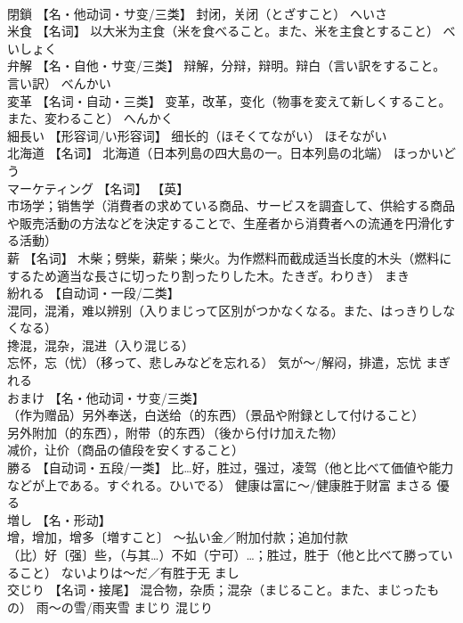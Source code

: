 \documentclass[8pt]{extreport}
\begin{document}
\begin{CJK}{UTF8}{min}
\\	閉鎖	【名・他动词・サ变/三类】 封闭，关闭（とざすこと）	へいさ	
\\	米食	【名词】 以大米为主食（米を食べること。また、米を主食とすること）	べいしょく	
\\	弁解	【名・自他・サ变/三类】 辩解，分辩，辩明。辩白（言い訳をすること。言い訳）	べんかい	
\\	変革	【名词・自动・三类】 变革，改革，变化（物事を変えて新しくすること。また、変わること）	へんかく	
\\	細長い	【形容词/い形容词】 细长的（ほそくてながい）	ほそながい	
\\	北海道	【名词】 北海道（日本列島の四大島の一。日本列島の北端）	ほっかいどう	
\\	マーケティング	【名词】 【英】
\\	[经营]市场学；销售学（消費者の求めている商品、サービスを調査して、供給する商品や販売活動の方法などを決定することで、生産者から消費者への流通を円滑化する活動）		
\\	薪	【名词】 木柴；劈柴，薪柴；柴火。为作燃料而截成适当长度的木头（燃料にするため適当な長さに切ったり割ったりした木。たきぎ。わりき）	まき	
\\	紛れる	【自动词・一段/二类】 
\\	混同，混淆，难以辨别（入りまじって区別がつかなくなる。また、はっきりしなくなる） 
\\	搀混，混杂，混进（入り混じる） 
\\	忘怀，忘（忧）（移って、悲しみなどを忘れる） 気が～/解闷，排遣，忘忧	まぎれる	
\\	おまけ	【名・他动词・サ变/三类】 
\\	（作为赠品）另外奉送，白送给（的东西）（景品や附録として付けること） 
\\	另外附加（的东西），附带（的东西）（後から付け加えた物） 
\\	减价，让价（商品の値段を安くすること）		
\\	勝る	【自动词・五段/一类】 比…好，胜过，强过，凌驾（他と比べて価値や能力などが上である。すぐれる。ひいでる） 健康は富に～/健康胜于财富	まさる	優る
\\	増し	【名・形动】 
\\	增，增加，增多〔増すこと〕 ～払い金／附加付款；追加付款 
\\	（比）好〔强〕些，（与其…）不如（宁可）…；胜过，胜于（他と比べて勝っていること） ないよりは～だ／有胜于无	まし	
\\	交じり	【名词・接尾】 混合物，杂质；混杂（まじること。また、まじったもの） 雨～の雪/雨夹雪	まじり	混じり

\end{CJK}
\end{document}
